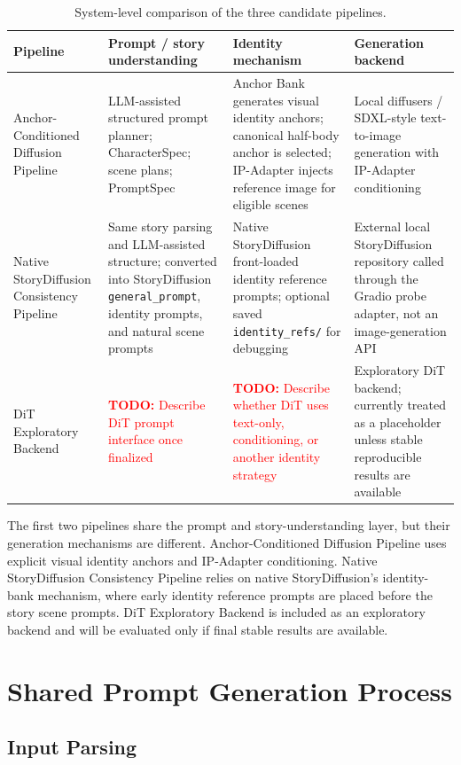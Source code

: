 \documentclass[11pt,a4paper]{article}
\newcommand{\todo}[1]{\textcolor{red}{\textbf{TODO:} #1}}
\newcommand{\pipelineA}{Anchor-Conditioned Diffusion Pipeline}
\newcommand{\pipelineB}{Native StoryDiffusion Consistency Pipeline}
\newcommand{\pipelineC}{DiT Exploratory Backend}
\begin{document}
\begin{table}[H]
\centering
\small
\begin{tabularx}{\textwidth}{p{} X X X}
\toprule
\textbf{Pipeline} & \textbf{Prompt / story understanding} & \textbf{Identity mechanism} & \textbf{Generation backend} \\
\midrule
\pipelineA & LLM-assisted structured prompt planner; CharacterSpec; scene plans; PromptSpec & Anchor Bank generates visual identity anchors; canonical half-body anchor is selected; IP-Adapter injects reference image for eligible scenes & Local diffusers / SDXL-style text-to-image generation with IP-Adapter conditioning \\
\midrule
\pipelineB & Same story parsing and LLM-assisted structure; converted into StoryDiffusion \texttt{general\_prompt}, identity prompts, and natural scene prompts & Native StoryDiffusion front-loaded identity reference prompts; optional saved \texttt{identity\_refs/} for debugging & External local StoryDiffusion repository called through the Gradio probe adapter, not an image-generation API \\
\midrule
\pipelineC & \todo{Describe DiT prompt interface once finalized} & \todo{Describe whether DiT uses text-only, conditioning, or another identity strategy} & Exploratory DiT backend; currently treated as a placeholder unless stable reproducible results are available \\
\bottomrule
\end{tabularx}
\caption{System-level comparison of the three candidate pipelines.}
\label{tab:pipeline_comparison}
\end{table}

The first two pipelines share the prompt and story-understanding layer, but their generation mechanisms are different. \pipelineA{} uses explicit visual identity anchors and IP-Adapter conditioning. \pipelineB{} relies on native StoryDiffusion's identity-bank mechanism, where early identity reference prompts are placed before the story scene prompts. \pipelineC{} is included as an exploratory backend and will be evaluated only if final stable results are available.

\section{Shared Prompt Generation Process}
\label{sec:prompt_generation}

\subsection{Input Parsing}
\end{document}
